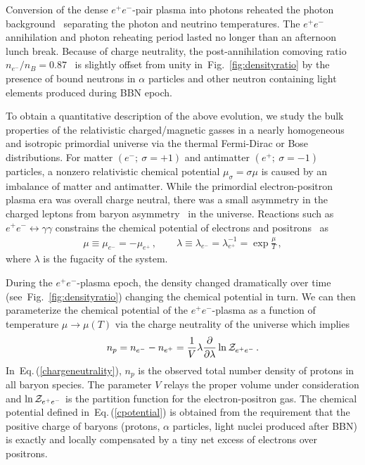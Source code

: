 \documentclass[aps,prd,floatfix,reprint]{revtex4-2}
\newcommand{\req}[1]{Eq.\,(\ref{#1})}
\newcommand{\rf}[1]{Fig.~{\ref{#1}}}
\begin{document}
Conversion of the dense $e^{+}e^{-}$-pair plasma into photons reheated the photon background~\cite{Birrell:2014uka} separating the photon and neutrino temperatures. The $e^{+}e^{-}$ annihilation and photon reheating period lasted no longer than an afternoon lunch break. Because of charge neutrality, the post-annihilation comoving ratio $n_{e^{-}}/n_{B}=0.87$~\cite{Rafelski:2023emw} is slightly offset from unity in~\rf{fig:densityratio} by the presence of bound neutrons in $\alpha$ particles and other neutron containing light elements produced during BBN epoch. 

To obtain a quantitative description of the above evolution, we study the bulk properties of the relativistic charged/magnetic gasses in a nearly homogeneous and isotropic primordial universe via the thermal Fermi-Dirac or Bose distributions. For matter $(e^{-};\ \sigma=+1)$ and antimatter $(e^{+};\ \sigma=-1)$ particles, a nonzero relativistic chemical potential $\mu_{\sigma}=\sigma\mu$ is caused by an imbalance of matter and antimatter. While the primordial electron-positron plasma era was overall charge neutral, there was a small asymmetry in the charged leptons from baryon asymmetry~\cite{Fromerth:2012fe,Canetti:2012zc} in the universe. Reactions such as $e^{+}e^{-}\leftrightarrow\gamma\gamma$ constrains the chemical potential of electrons and positrons~\cite{Elze:1980er} as 
\begin{align}
 \label{cpotential}
 \mu\equiv\mu_{e^{-}}=-\mu_{e^{+}}\,,\qquad
 \lambda\equiv\lambda_{e^{-}}=\lambda_{e^{+}}^{-1}=\exp\frac{\mu}{T}\,,
\end{align}
where $\lambda$ is the fugacity of the system. 

During the $e^{+}e^{-}$-plasma epoch, the density changed dramatically over time (see~\rf{fig:densityratio}) changing the chemical potential in turn. We can then parameterize the chemical potential of the $e^{+}e^{-}$-plasma as a function of temperature $\mu\rightarrow\mu(T)$ via the charge neutrality of the universe which implies
\begin{align}
 \label{chargeneutrality}
 n_{p}=n_{e^{-}}-n_{e^{+}}=\frac{1}{V}\lambda\frac{\partial}{\partial\lambda}\ln{\cal Z}_{e^{+}e^{-}}\,.
\end{align}
In~\req{chargeneutrality}, $n_{p}$ is the observed total number density of protons in all baryon species. The parameter $V$ relays the proper volume under consideration and $\ln{\cal Z}_{e^{+}e^{-}}$ is the partition function for the electron-positron gas. The chemical potential defined in~\req{cpotential} is obtained from the requirement that the positive charge of baryons (protons, $\alpha$ particles, light nuclei produced after BBN) is exactly and locally compensated by a tiny net excess of electrons over positrons.
\end{document}
